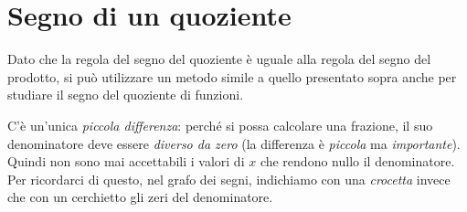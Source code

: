 \section{Segno di un quoziente}
\label{sec:dis_quoziente}

Dato che la regola del segno del quoziente è uguale alla regola del 
segno del prodotto,
si può utilizzare un metodo simile a quello presentato sopra anche 
per studiare il segno del quoziente di funzioni.

C'è un'unica \emph{piccola differenza}: perché si possa calcolare una 
frazione, il suo denominatore deve essere \emph{diverso da zero} (la 
differenza è \emph{piccola} ma \emph{importante}). 
Quindi non sono mai accettabili i valori di \(x\) che rendono nullo il 
denominatore.
Per ricordarci di questo, nel grafo dei segni, indichiamo con una 
\emph{crocetta} invece che con un cerchietto gli zeri del denominatore.

